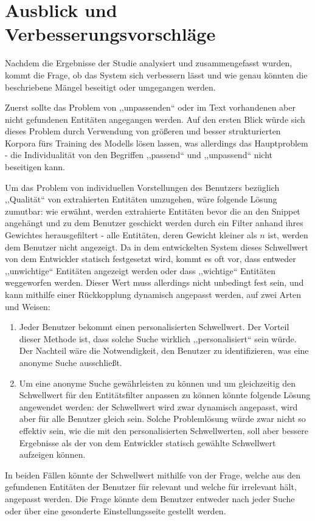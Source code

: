 \section{Ausblick und Verbesserungsvorschläge}
Nachdem die Ergebnisse der Studie analysiert und zusammengefasst wurden, kommt die Frage, ob das System sich verbessern lässt und wie genau könnten die beschriebene Mängel beseitigt oder umgegangen werden.

Zuerst sollte das Problem von ,,unpassenden`` oder im Text vorhandenen aber nicht gefundenen Entitäten angegangen werden. Auf den ersten Blick würde sich dieses Problem durch Verwendung von größeren und besser strukturierten Korpora fürs Training des Modells lösen lassen, was allerdings das Hauptproblem - die Individualität von den Begriffen ,,passend`` und ,,unpassend`` nicht beseitigen kann.

Um das Problem von individuellen Vorstellungen des Benutzers bezüglich ,,Qualität`` von extrahierten Entitäten umzugehen, wäre folgende Lösung zumutbar: wie erwähnt, werden extrahierte Entitäten bevor die an den Snippet angehängt und zu dem Benutzer geschickt werden durch ein Filter anhand ihres Gewichtes herausgefiltert - alle Entitäten, deren Gewicht kleiner als $n$ ist, werden dem Benutzer nicht angezeigt. Da in dem entwickelten System dieses Schwellwert von dem Entwickler statisch festgesetzt wird, kommt es oft vor, dass entweder ,,unwichtige`` Entitäten angezeigt werden oder dass ,,wichtige`` Entitäten weggeworfen werden. Dieser Wert muss allerdings nicht unbedingt fest sein, und kann mithilfe einer Rückkopplung dynamisch angepasst werden, auf zwei Arten und Weisen:
\begin{enumerate}
\item Jeder Benutzer bekommt einen personalisierten Schwellwert. Der Vorteil dieser Methode ist, dass solche Suche wirklich ,,personalisiert`` sein würde. Der Nachteil wäre die Notwendigkeit, den Benutzer zu identifizieren, was eine anonyme Suche ausschließt. 
\item Um eine anonyme Suche gewährleisten zu können und um gleichzeitig den Schwellwert für den Entitätsfilter anpassen zu können könnte folgende Lösung angewendet werden: der Schwellwert wird zwar dynamisch angepasst, wird aber für alle Benutzer gleich sein. Solche Problemlösung würde zwar nicht so effektiv sein, wie die mit den personalisierten Schwellwerten, soll aber bessere Ergebnisse als der von dem Entwickler statisch gewählte Schwellwert aufzeigen können.
\end{enumerate}
In beiden Fällen könnte der Schwellwert mithilfe von der Frage, welche aus den gefundenen Entitäten der Benutzer für relevant und welche für irrelevant hält, angepasst werden. Die Frage könnte dem Benutzer entweder nach jeder Suche oder über eine gesonderte Einstellungsseite gestellt werden.

